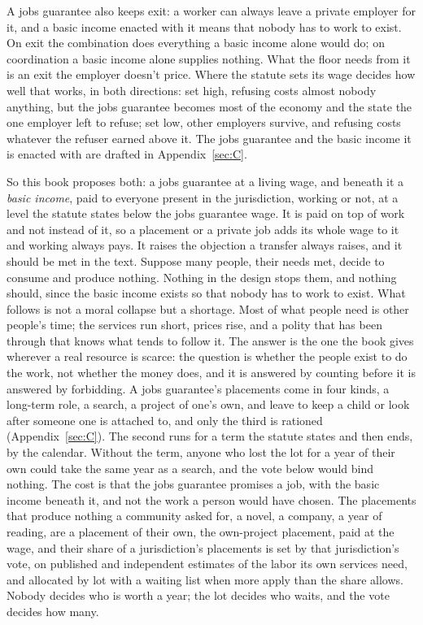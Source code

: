 A jobs guarantee also keeps exit: a worker can always leave a private employer for it, and a basic income enacted with it means that nobody has to work to exist. On exit the combination does everything a basic income alone would do; on coordination a basic income alone supplies nothing. What the floor needs from it is an exit the employer doesn't price. Where the statute sets its wage decides how well that works, in both directions: set high, refusing costs almost nobody anything, but the jobs guarantee becomes most of the economy and the state the one employer left to refuse; set low, other employers survive, and refusing costs whatever the refuser earned above it. The jobs guarantee and the basic income it is enacted with are drafted in Appendix~\ref{sec:C}.

So this book proposes both: a jobs guarantee at a living wage, and beneath it a \emph{basic income}, paid to everyone present in the jurisdiction, working or not, at a level the statute states below the jobs guarantee wage. It is paid on top of work and not instead of it, so a placement or a private job adds its whole wage to it and working always pays. It raises the objection a transfer always raises, and it should be met in the text. Suppose many people, their needs met, decide to consume and produce nothing. Nothing in the design stops them, and nothing should, since the basic income exists so that nobody has to work to exist. What follows is not a moral collapse but a shortage. Most of what people need is other people's time; the services run short, prices rise, and a polity that has been through that knows what tends to follow it. The answer is the one the book gives wherever a real resource is scarce: the question is whether the people exist to do the work, not whether the money does, and it is answered by counting before it is answered by forbidding. A jobs guarantee's placements come in four kinds, a long-term role, a search, a project of one's own, and leave to keep a child or look after someone one is attached to, and only the third is rationed (Appendix~\ref{sec:C}). The second runs for a term the statute states and then ends, by the calendar. Without the term, anyone who lost the lot for a year of their own could take the same year as a search, and the vote below would bind nothing. The cost is that the jobs guarantee promises a job, with the basic income beneath it, and not the work a person would have chosen. The placements that produce nothing a community asked for, a novel, a company, a year of reading, are a placement of their own, the own-project placement, paid at the wage, and their share of a jurisdiction's placements is set by that jurisdiction's vote, on published and independent estimates of the labor its own services need, and allocated by lot with a waiting list when more apply than the share allows. Nobody decides who is worth a year; the lot decides who waits, and the vote decides how many.

